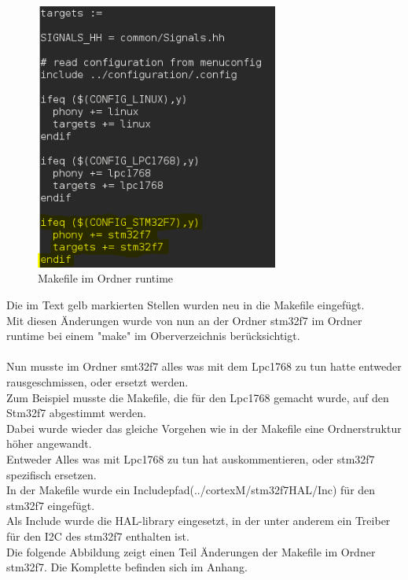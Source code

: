 \begin{figure}[h]
\begin{center}
\includegraphics[width=8cm]{grafiken/Makefile_runtime1.png}
\caption{Makefile im Ordner runtime}
\label{Makefile_runtime}
\end{center}
\end{figure}
\newpage
\noindent
Die im Text gelb markierten Stellen wurden neu in die Makefile eingefügt.\\
Mit diesen Änderungen wurde von nun an der Ordner stm32f7 im Ordner runtime bei einem "make" im Oberverzeichnis berücksichtigt.\\
\\
Nun musste im Ordner smt32f7 alles was mit dem Lpc1768 zu tun hatte entweder rausgeschmissen, oder ersetzt werden.\\
Zum Beispiel musste die Makefile, die für den Lpc1768 gemacht wurde, auf den Stm32f7 abgestimmt werden.\\
Dabei wurde wieder das gleiche Vorgehen wie in der Makefile eine Ordnerstruktur höher angewandt.\\
Entweder Alles was mit Lpc1768 zu tun hat auskommentieren, oder stm32f7 spezifisch ersetzen.\\
In der Makefile wurde ein Includepfad(../cortexM/stm32f7HAL/Inc) für den stm32f7 eingefügt.\\
Als Include wurde die HAL-library eingesetzt, in der unter anderem ein Treiber für den I2C des stm32f7 enthalten ist.\\ 
Die folgende Abbildung zeigt einen Teil Änderungen der Makefile im Ordner stm32f7. Die Komplette  befinden sich im Anhang.\newpage
